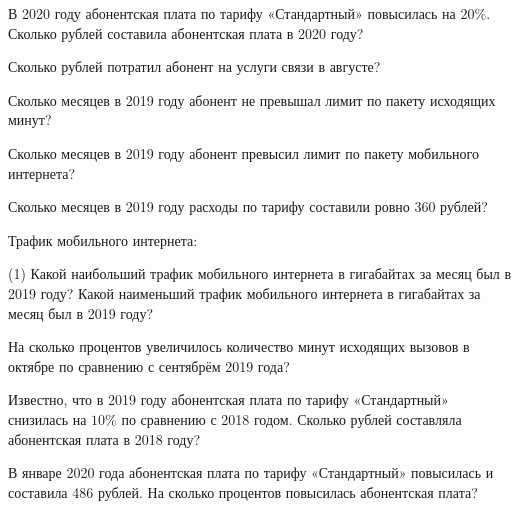\begin{exam}
	\begin{listofex}
		 \item В 2020 году абонентская плата по тарифу «Стандартный» повысилась
		на \( 20\% \). Сколько рублей составила абонентская плата в 2020 году?
		
		\item Сколько рублей потратил абонент на услуги связи в августе? 
		\item Сколько месяцев в 2019 году абонент не превышал лимит по пакету исходящих минут? 
		\item Сколько месяцев в 2019 году абонент превысил лимит по пакету мобильного интернета?
		\item Сколько месяцев в 2019 году расходы по тарифу составили ровно 360 рублей?
		\item Трафик мобильного интернета:
		\begin{tasks}(1)
			\task[A)] Какой наибольший трафик мобильного интернета в гигабайтах за месяц
			был в 2019 году?
			\task[Б)] Какой наименьший трафик мобильного интернета в гигабайтах за месяц был в 2019 году?
		\end{tasks}
		\item На сколько процентов увеличилось количество минут исходящих вызовов в октябре по сравнению с сентябрём 2019 года?
		\item Известно, что в 2019 году абонентская плата по тарифу «Стандартный» снизилась на \( 10\% \) по сравнению с 2018 годом. Сколько рублей составляла абонентская плата в 2018 году? 
		\item В январе 2020 года абонентская плата по тарифу «Стандартный» повысилась и составила 486 рублей. На сколько процентов повысилась абонентская плата?
	\end{listofex}
\end{exam}
